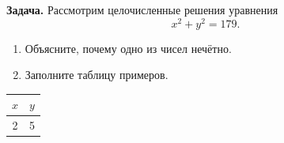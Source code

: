 \documentclass[12pt]{article}
\newcommand{\problem}{\par\noindent\textbf{Задача.} }
\newcommand{\eproblem}{\par}
\begin{document}
\problem
Рассмотрим целочисленные решения уравнения
\[
  x^2 + y^2 = 179.
\]

\begin{enumerate}
  \item Объясните, почему одно из чисел нечётно.
  \item Заполните таблицу примеров.
\end{enumerate}

\begin{center}
\begin{tabular}{|c|c|}
\hline
$x$ & $y$ \\
\hline
2 & 5 \\
\hline
\end{tabular}
\end{center}

\begin{center}
\end{center}
\eproblem
\end{document}
